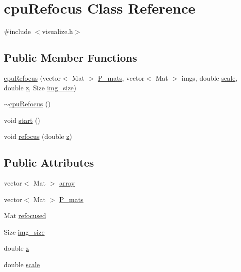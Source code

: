 \hypertarget{classcpuRefocus}{\section{cpu\-Refocus Class Reference}
\label{db/df2/classcpuRefocus}
}


{\ttfamily \#include $<$visualize.\-h$>$}

\subsection*{Public Member Functions}
\begin{DoxyCompactItemize}
\item 
\hyperlink{classcpuRefocus_a3866f972073b5532628f44be97aaa33d}{cpu\-Refocus} (vector$<$ Mat $>$ \hyperlink{classcpuRefocus_a5118d8dd93e7f29036018f0298f3e510}{P\-\_\-mats}, vector$<$ Mat $>$ imgs, double \hyperlink{classcpuRefocus_a04beb5d2309c9fd6ab07af93c5bfdbfa}{scale}, double \hyperlink{classcpuRefocus_a9a19ed4cd125f555ca8a646574b0593c}{z}, Size \hyperlink{classcpuRefocus_ac2b296ff170fd88ef9c3bb31e1ef9a7b}{img\-\_\-size})
\item 
\hyperlink{classcpuRefocus_a64b13f3ff7051ab641756773c5d66979}{$\sim$cpu\-Refocus} ()
\item 
void \hyperlink{classcpuRefocus_a013771771ba3e9a6a8ad3f4632ff38a0}{start} ()
\item 
void \hyperlink{classcpuRefocus_aaeaf04bd8af93b84a2b0294ea101ae06}{refocus} (double \hyperlink{classcpuRefocus_a9a19ed4cd125f555ca8a646574b0593c}{z})
\end{DoxyCompactItemize}
\subsection*{Public Attributes}
\begin{DoxyCompactItemize}
\item 
vector$<$ Mat $>$ \hyperlink{classcpuRefocus_a6eda3a5bcf68f0eaee5cc2ee70f7302b}{array}
\item 
vector$<$ Mat $>$ \hyperlink{classcpuRefocus_a5118d8dd93e7f29036018f0298f3e510}{P\-\_\-mats}
\item 
Mat \hyperlink{classcpuRefocus_a0fddfc2019021e97892314faef6bf211}{refocused}
\item 
Size \hyperlink{classcpuRefocus_ac2b296ff170fd88ef9c3bb31e1ef9a7b}{img\-\_\-size}
\item 
double \hyperlink{classcpuRefocus_a9a19ed4cd125f555ca8a646574b0593c}{z}
\item 
double \hyperlink{classcpuRefocus_a04beb5d2309c9fd6ab07af93c5bfdbfa}{scale}
\end{DoxyCompactItemize}


